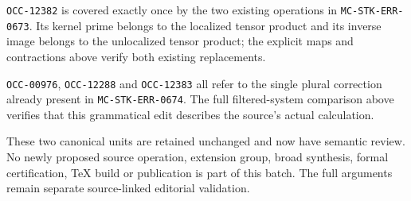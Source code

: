 \texttt{OCC-12382} is covered exactly once by the two existing operations in \texttt{MC-\AlgebraIdentifierBreak{}STK-\AlgebraIdentifierBreak{}ERR-\AlgebraIdentifierBreak{}0673}. Its kernel prime belongs to the localized tensor product and its inverse image belongs to the unlocalized tensor product; the explicit maps and contractions above verify both existing replacements.

\texttt{OCC-00976}, \texttt{OCC-12288} and \texttt{OCC-12383} all refer to the single plural correction already present in \texttt{MC-\AlgebraIdentifierBreak{}STK-\AlgebraIdentifierBreak{}ERR-\AlgebraIdentifierBreak{}0674}. The full filtered-system comparison above verifies that this grammatical edit describes the source's actual calculation.

These two canonical units are retained unchanged and now have semantic review. No newly proposed source operation, extension group, broad synthesis, formal certification, TeX build or publication is part of this batch. The full arguments remain separate source-linked editorial validation.

